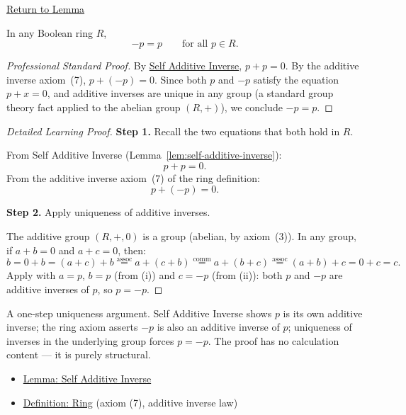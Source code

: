 \newpage
{}
\label{prf:self-negation}

\begin{remark*}[Return]
\hyperref[lem:self-negation]{Return to Lemma}

\end{remark*}

\begin{lemma*}
In any Boolean ring $R$,
\[
-p = p \qquad \text{for all } p \in R.
\]
\end{lemma*}

\begin{proof}[Professional Standard Proof]
\LRAProofBodyStart
By \hyperref[lem:self-additive-inverse]{Self Additive Inverse}, $p + p = 0$.
By the additive inverse axiom~(7), $p + (-p) = 0$.
Since both $p$ and $-p$ satisfy the equation $p + x = 0$, and additive
inverses are unique in any group (a standard group theory fact applied to
the abelian group $(R,+)$), we conclude $-p = p$.
\end{proof}

\begin{proof}[Detailed Learning Proof]
\LRAProofBodyStart

\textbf{Step 1.} Recall the two equations that both hold in $R$.

From Self Additive Inverse (Lemma~\ref{lem:self-additive-inverse}):
\[
p + p = 0. \tag{i}
\]
From the additive inverse axiom~(7) of the ring definition:
\[
p + (-p) = 0. \tag{ii}
\]

\textbf{Step 2.} Apply uniqueness of additive inverses.

The additive group $(R,+,0)$ is a group (abelian, by axiom~(3)). In any
group, if $a + b = 0$ and $a + c = 0$, then:
\[
b = 0 + b = (a + c) + b \overset{\text{assoc}}{=} a + (c + b)
\overset{\text{comm}}{=} a + (b + c) \overset{\text{assoc}}{=} (a+b)+c = 0+c = c.
\]
Apply with $a = p$, $b = p$ (from (i)) and $c = -p$ (from (ii)):
both $p$ and $-p$ are additive inverses of $p$, so $p = -p$.
\end{proof}

\begin{remark*}
A one-step uniqueness argument. Self Additive Inverse shows $p$ is its
own additive inverse; the ring axiom asserts $-p$ is also an additive
inverse of $p$; uniqueness of inverses in the underlying group forces
$p = -p$. The proof has no calculation content --- it is purely structural.
\end{remark*}

\begin{dependencies}
\begin{itemize}
  \item \hyperref[lem:self-additive-inverse]{Lemma: Self Additive Inverse}
  \item \hyperref[def:ring]{Definition: Ring} (axiom (7), additive inverse law)
\end{itemize}
\end{dependencies}

\clearpage
